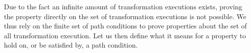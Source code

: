 % 
% 
% 

Due to the fact an infinite amount of transformation executions exists, proving the property directly on the set of transformation executions is not possible. We thus rely on the finite set of path conditions to prove properties about the set of all transformation execution. Let us then define what it means for a property to hold on, or be satisfied by, a path condition.  

